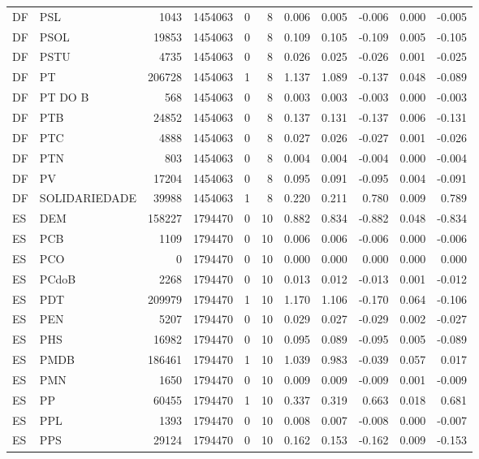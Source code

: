 \begin{landscape}
\begin{longtable}{llrrrrrrrrr}
DF & PSL & 1043 & 1454063 & 0 & 8 & 0.006 & 0.005 & -0.006 & 0.000 & -0.005 \\
DF & PSOL & 19853 & 1454063 & 0 & 8 & 0.109 & 0.105 & -0.109 & 0.005 & -0.105 \\
DF & PSTU & 4735 & 1454063 & 0 & 8 & 0.026 & 0.025 & -0.026 & 0.001 & -0.025 \\
DF & PT & 206728 & 1454063 & 1 & 8 & 1.137 & 1.089 & -0.137 & 0.048 & -0.089 \\
DF & PT DO B & 568 & 1454063 & 0 & 8 & 0.003 & 0.003 & -0.003 & 0.000 & -0.003 \\
DF & PTB & 24852 & 1454063 & 0 & 8 & 0.137 & 0.131 & -0.137 & 0.006 & -0.131 \\
DF & PTC & 4888 & 1454063 & 0 & 8 & 0.027 & 0.026 & -0.027 & 0.001 & -0.026 \\
DF & PTN & 803 & 1454063 & 0 & 8 & 0.004 & 0.004 & -0.004 & 0.000 & -0.004 \\
DF & PV & 17204 & 1454063 & 0 & 8 & 0.095 & 0.091 & -0.095 & 0.004 & -0.091 \\
DF & SOLIDARIEDADE & 39988 & 1454063 & 1 & 8 & 0.220 & 0.211 & 0.780 & 0.009 & 0.789 \\
ES & DEM & 158227 & 1794470 & 0 & 10 & 0.882 & 0.834 & -0.882 & 0.048 & -0.834 \\
ES & PCB & 1109 & 1794470 & 0 & 10 & 0.006 & 0.006 & -0.006 & 0.000 & -0.006 \\
ES & PCO & 0 & 1794470 & 0 & 10 & 0.000 & 0.000 & 0.000 & 0.000 & 0.000 \\
ES & PCdoB & 2268 & 1794470 & 0 & 10 & 0.013 & 0.012 & -0.013 & 0.001 & -0.012 \\
ES & PDT & 209979 & 1794470 & 1 & 10 & 1.170 & 1.106 & -0.170 & 0.064 & -0.106 \\
ES & PEN & 5207 & 1794470 & 0 & 10 & 0.029 & 0.027 & -0.029 & 0.002 & -0.027 \\
ES & PHS & 16982 & 1794470 & 0 & 10 & 0.095 & 0.089 & -0.095 & 0.005 & -0.089 \\
ES & PMDB & 186461 & 1794470 & 1 & 10 & 1.039 & 0.983 & -0.039 & 0.057 & 0.017 \\
ES & PMN & 1650 & 1794470 & 0 & 10 & 0.009 & 0.009 & -0.009 & 0.001 & -0.009 \\
ES & PP & 60455 & 1794470 & 1 & 10 & 0.337 & 0.319 & 0.663 & 0.018 & 0.681 \\
ES & PPL & 1393 & 1794470 & 0 & 10 & 0.008 & 0.007 & -0.008 & 0.000 & -0.007 \\
ES & PPS & 29124 & 1794470 & 0 & 10 & 0.162 & 0.153 & -0.162 & 0.009 & -0.153 \\

\end{longtable}
\end{landscape}
